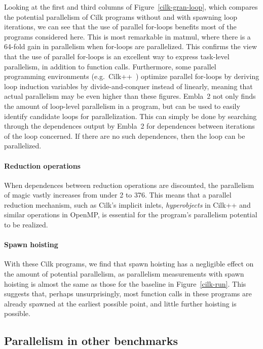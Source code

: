Looking at the first and third columns of Figure~\ref{cilk-gran-loop}, which
compares the potential parallelism of Cilk programs without and with spawning loop iterations, we can see that the use of parallel for-loops benefits most of the programs considered here.
This is most remarkable in \textsf{matmul}, where there is a 64-fold gain in parallelism when for-loops are parallelized.
This confirms the view that the use of parallel for-loops is an excellent way to express task-level parallelism, in addition to function calls.
Furthermore, some parallel programming environments (e.g.\ Cilk++~\cite{leiserson09cilk}) optimize parallel for-loops by deriving loop induction variables by divide-and-conquer instead of linearly,
meaning that actual parallelism may be even higher than these figures.
Embla~2 not only finds the amount of loop-level parallelism in a program, but can be used to easily identify candidate loops for parallelization.
This can simply be done by searching through the dependences output by Embla~2 for dependences between iterations of the loop concerned.
If there are no such dependences, then the loop can be parallelized.

\paragraph{Reduction operations}

When dependences between reduction operations are discounted,
the parallelism of \textsf{magic} vastly increases from under 2 to 376.
This means that a parallel reduction mechanism, such as Cilk's implicit inlets, \emph{hyperobjects} in Cilk++ and similar operations in OpenMP,
is essential for the program's parallelism potential to be realized.

\paragraph{Spawn hoisting}

With these Cilk programs, we find that spawn hoisting has a negligible effect on the amount of potential parallelism, as parallelism measurements with spawn hoisting is almost the same as those for the baseline in Figure~\ref{cilk-run}.
This suggests that, perhaps unsurprisingly, most function calls in these programs are already spawned at the earliest possible point, and little further hoisting is possible.

\subsection{Parallelism in other benchmarks} \label{sresults:benchmarks}


